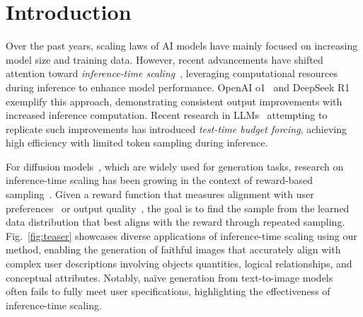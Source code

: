 \vspace{-1.25\baselineskip}
\section{Introduction}
\label{sec:intro}
Over the past years, scaling laws of AI models have mainly focused on increasing model size and training data. However, recent advancements have shifted attention toward \emph{inference-time scaling}~\cite{Stiennon:2020BoN, Touvron:2023llama2}, leveraging computational resources during inference to enhance model performance. 
OpenAI o1~\cite{openai:o1} and DeepSeek R1~\cite{deekseek:r1} exemplify this approach, demonstrating consistent output improvements with increased inference computation. Recent research in LLMs~\cite{Muennighoff:2025s1} attempting to replicate such improvements has introduced \emph{test-time budget forcing}, achieving high efficiency with limited token sampling during inference. 

For diffusion models~\cite{Sohl-Dickstein:2025Thermo,Song:2021SDE}, which are widely used for generation tasks, research on inference-time scaling has been growing in the context of reward-based sampling~\cite{Kim:2025DAS, Li2024:SVDD, Singh:2025CoDE}. Given a reward function that measures alignment with user preferences~\cite{Kirstain2023:pickapic} or output quality~\cite{Schuhmann:aesthetics, Lin:2024CLIPFlanT5}, the goal is to find the sample from the learned data distribution that best aligns with the reward through repeated sampling. 
Fig.~\ref{fig:teaser} showcases diverse applications of inference-time scaling using our method, enabling the generation of faithful images that accurately align with complex user descriptions involving objects quantities, logical relationships, and conceptual attributes. Notably, na\"ive generation from text-to-image models~\cite{Rombach:2022LDM, BlackForestLabs:2024Flux} often fails to fully meet user specifications, highlighting the effectiveness of inference-time scaling. 


